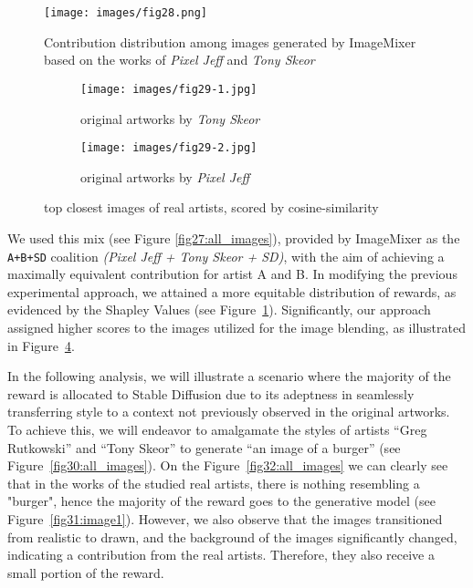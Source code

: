 \documentclass[12pt, letterpaper]{article}
\begin{document}
\begin{figure}[h]
    \centering
    \texttt{[image: images/fig28.png]}
    \caption{Contribution distribution among images generated by ImageMixer based on the works of \textit{Pixel Jeff} and \textit{Tony Skeor}}
    \label{fig28:image1}
\end{figure}

\begin{figure}[h]
    \centering
    \begin{subfigure}{0.48\textwidth}
        \centering
        \texttt{[image: images/fig29-1.jpg]}
        \caption{original artworks by \textit{Tony Skeor}}
        \label{fig29:first_image}
    \end{subfigure}
    \begin{subfigure}{0.48\textwidth}
        \centering
        \texttt{[image: images/fig29-2.jpg]}
        \caption{original artworks by \textit{Pixel Jeff}}
        \label{fig29:second_image}
    \end{subfigure}
    \caption{top closest images of real artists, scored by cosine-similarity}
    \label{fig29:all_images}    
\end{figure}

We used this mix (see Figure \ref{fig27:all_images}), provided by ImageMixer as the \texttt{A+B+SD} coalition \textit{(Pixel Jeff + Tony Skeor + SD)}, with the aim of achieving a maximally equivalent contribution for artist A and B. In modifying the previous experimental approach, we attained a more equitable distribution of rewards, as evidenced by the Shapley Values (see Figure~\ref{fig28:image1}). Significantly, our approach assigned higher scores to the images utilized for the image blending, as illustrated in Figure~\ref{fig29:all_images}.

In the following analysis, we will illustrate a scenario where the majority of the reward is allocated to Stable Diffusion due to its adeptness in seamlessly transferring style to a context not previously observed in the original artworks. To achieve this, we will endeavor to amalgamate the styles of artists “Greg Rutkowski” and “Tony Skeor” to generate “an image of a burger” (see Figure~\ref{fig30:all_images}). On the Figure~\ref{fig32:all_images} we can clearly see that in the works of the studied real artists, there is nothing resembling a "burger", hence the majority of the reward goes to the generative model (see Figure~\ref{fig31:image1}). However, we also observe that the images transitioned from realistic to drawn, and the background of the images significantly changed, indicating a contribution from the real artists. Therefore, they also receive a small portion of the reward.
\end{document}
